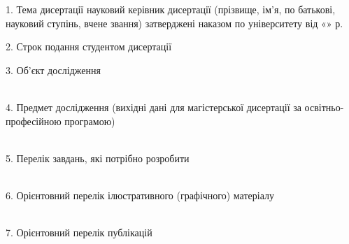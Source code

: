 \documentclass[]{lib/styles/additional-docs}
\begin{document}
  \vspace{0.5em}
  
  1. Тема дисертації 
  \leftAlignedWithCenterUnderlineSign
  { науковий керівник дисертації   }
  { (прізвище, ім’я, по батькові, науковий ступінь, вчене звання) }
  затверджені наказом по університету від «\uline{\hspace*{1.5em}}» \uline{\hspace*{5em}} \currentYear р.  \No{} \uline{\hspace*{2em}}
  
  \vspace{1em}

  2. Строк подання студентом дисертації \lineunderscore

  \vspace{1em}

  3. Об’єкт дослідження
  \\
  \lineunderscore\\
  \lineunderscore

  \vspace{1em}

  4. Предмет дослідження (вихідні  дані  для  магістерської  дисертації  за освітньо-професійною  програмою)
  \\
  \lineunderscore\\
  \lineunderscore

  \clearpage
  \thispagestyle{empty}

  5. Перелік  завдань,  які  потрібно  розробити
   \\
  \lineunderscore\\
  \lineunderscore

  \vspace{1em}

  6. Орієнтовний  перелік  ілюстративного  (графічного)  матеріалу
   \\
  \lineunderscore\\
  \lineunderscore

  \vspace{1em}

  7. Орієнтовний перелік публікацій
   \\
  \lineunderscore\\
  \lineunderscore

  \vspace{1em}
  
\end{document}
